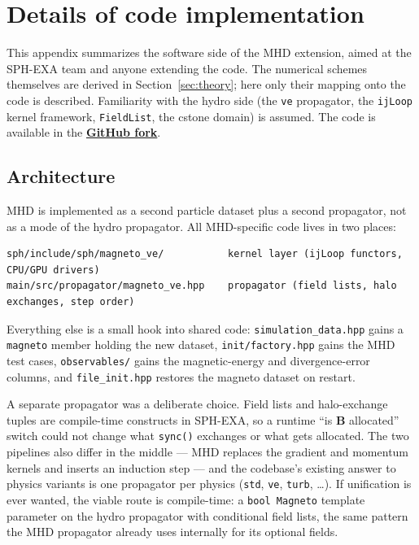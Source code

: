 \newpage

\section{Details of code implementation}
\label{sec:appendixB}


This appendix summarizes the software side of the MHD extension, aimed at the SPH-EXA team and anyone extending the code. The numerical schemes themselves are derived in Section~\ref{sec:theory}; here only their mapping onto the code is described. Familiarity with the hydro side (the \texttt{ve} propagator, the \texttt{ijLoop} kernel framework, \texttt{FieldList}, the cstone domain) is assumed. The code is available in the \href{https://github.com/MuellerNico/sphexa/}{\textbf{GitHub fork}}.

\subsection{Architecture}

MHD is implemented as a second particle dataset plus a second propagator, not as a mode of the hydro propagator. All MHD-specific code lives in two places:

\begin{verbatim}
sph/include/sph/magneto_ve/           kernel layer (ijLoop functors, CPU/GPU drivers)
main/src/propagator/magneto_ve.hpp    propagator (field lists, halo exchanges, step order)
\end{verbatim}

Everything else is a small hook into shared code: \texttt{simulation\_data.hpp} gains a \texttt{magneto} member holding the new dataset, \texttt{init/factory.hpp} gains the MHD test cases, \texttt{observables/} gains the magnetic-energy and divergence-error columns, and \texttt{file\_init.hpp} restores the magneto dataset on restart.

A separate propagator was a deliberate choice. Field lists and halo-exchange tuples are compile-time constructs in SPH-EXA, so a runtime ``is $\mathbf{B}$ allocated'' switch could not change what \texttt{sync()} exchanges or what gets allocated. The two pipelines also differ in the middle --- MHD replaces the gradient and momentum kernels and inserts an induction step --- and the codebase's existing answer to physics variants is one propagator per physics (\texttt{std}, \texttt{ve}, \texttt{turb}, \dots). If unification is ever wanted, the viable route is compile-time: a \texttt{bool Magneto} template parameter on the hydro propagator with conditional field lists, the same pattern the MHD propagator already uses internally for its optional fields.

